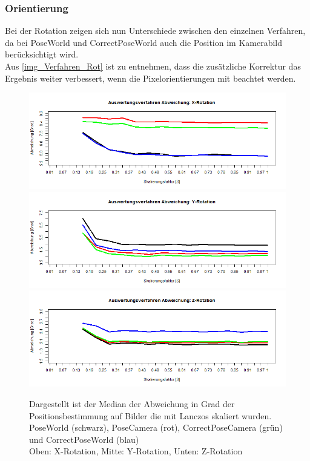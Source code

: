 \subsubsection{Orientierung}
Bei der Rotation zeigen sich nun Unterschiede zwischen den einzelnen Verfahren, da bei PoseWorld und CorrectPoseWorld auch die Position im Kamerabild berücksichtigt wird.\\
Aus \autoref{img_Verfahren_Rot} ist zu entnehmen, dass die zusätzliche Korrektur das Ergebnis weiter verbessert, wenn die Pixelorientierungen mit beachtet werden.
\begin{figure}
	\centering
	\includegraphics[width=\linewidth]{img_Skalierung/Verfahren_RX}
	\includegraphics[width=\linewidth]{img_Skalierung/Verfahren_RY}
	\includegraphics[width=\linewidth]{img_Skalierung/Verfahren_RZ}
	\caption{Dargestellt ist der Median der Abweichung in Grad der Positionsbestimmung auf Bilder die mit Lanczos skaliert wurden.\\
		PoseWorld (schwarz), PoseCamera (rot), CorrectPoseCamera (grün) und CorrectPoseWorld (blau)\\
		Oben: X-Rotation, Mitte: Y-Rotation, Unten: Z-Rotation}
	\label{img_Verfahren_Rot}
\end{figure}

